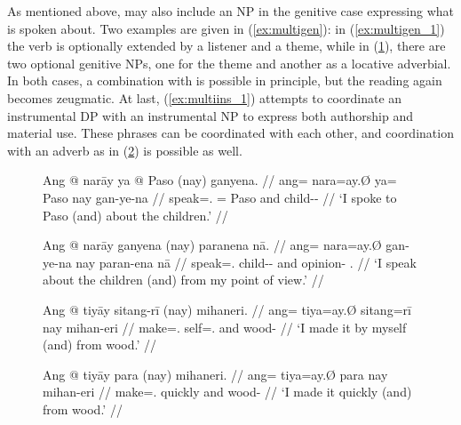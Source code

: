 As mentioned above,  may also include an NP in the genitive
case expressing what is spoken about. Two examples are given in
(\ref{ex:multigen}): in (\ref{ex:multigen_1}) the verb is optionally extended
by a listener and a theme, while in (\ref{ex:multigen_2}), there are two
optional genitive NPs, one for the theme and another as a locative adverbial.
In both cases, a combination with  is possible in principle,
but the reading again becomes zeugmatic. At last, (\ref{ex:multiins_1})
attempts to coordinate an instrumental DP with an instrumental NP to express
both authorship and material use. These phrases can be coordinated with each
other, and coordination with an adverb as in (\ref{ex:multiins_2}) is possible
as well.

\begin{figure}[h]
\pex\label{ex:multigen}
\a\label{ex:multigen_1}%
\begingl
	\gla Ang @ narāy ya @ Paso \textup{(\excl{}}nay\textup{)} ganyena. //
	\glb ang= nara=ay.Ø ya= Paso nay gan-ye-na //
	\glc \AgtT{} speak=\Fsg{}.\Top{} \Loc{}= Paso and child-\Pl{}-\Gen{} //
	\glft `I spoke to Paso (\excl{}and) about the children.' //
\endgl

\a\label{ex:multigen_2}%
\begingl
	\gla Ang @ narāy ganyena \textup{(\excl{}}nay\textup{)} paranena nā. //
	\glb ang= nara=ay.Ø gan-ye-na nay paran-ena nā //
	\glc \AgtT{} speak=\Fsg{}.\Top{} child-\Pl{}-\Gen{} and opinion-\Gen{}
		\Fsg{}.\Gen{} //
	\glft `I speak about the children (\excl{}and) from my point of view.' //
\endgl
\xe
\end{figure}

\begin{figure}
\pex\label{ex:multiins}%
\a\label{ex:multiins_1}%
\begingl
	\gla Ang @ tiyāy sitang-rī \textup{(}nay\textup{)} mihaneri. //
	\glb ang= tiya=ay.Ø sitang=rī nay mihan-eri //
	\glc \AgtT{} make=\Fsg{}.\Top{} self=\Fsg{}.\Ins{} and wood-\Ins{} //
	\glft `I made it by myself (and) from wood.' //
\endgl

\a\label{ex:multiins_2}%
\begingl
	\gla Ang @ tiyāy para \textup{(}nay\textup{)} mihaneri. //
	\glb ang= tiya=ay.Ø para nay mihan-eri //
	\glc \AgtT{} make=\Fsg{}.\Top{} quickly and wood-\Ins{} //
	\glft `I made it quickly (and) from wood.' //
\endgl
\xe
\end{figure}

